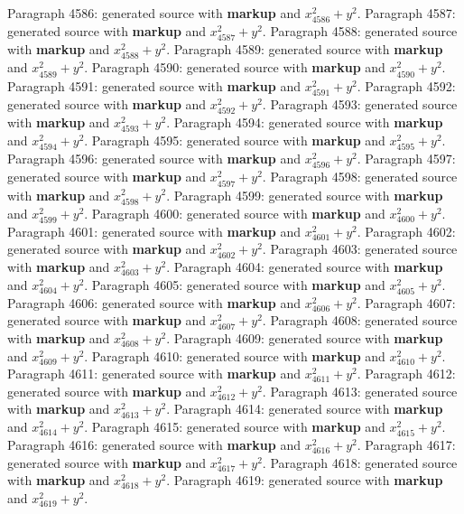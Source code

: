 \documentclass{article}
\begin{document}
Paragraph 4586: generated source with \textbf{markup} and $x_{4586}^2 + y^2$.
Paragraph 4587: generated source with \textbf{markup} and $x_{4587}^2 + y^2$.
Paragraph 4588: generated source with \textbf{markup} and $x_{4588}^2 + y^2$.
Paragraph 4589: generated source with \textbf{markup} and $x_{4589}^2 + y^2$.
Paragraph 4590: generated source with \textbf{markup} and $x_{4590}^2 + y^2$.
Paragraph 4591: generated source with \textbf{markup} and $x_{4591}^2 + y^2$.
Paragraph 4592: generated source with \textbf{markup} and $x_{4592}^2 + y^2$.
Paragraph 4593: generated source with \textbf{markup} and $x_{4593}^2 + y^2$.
Paragraph 4594: generated source with \textbf{markup} and $x_{4594}^2 + y^2$.
Paragraph 4595: generated source with \textbf{markup} and $x_{4595}^2 + y^2$.
Paragraph 4596: generated source with \textbf{markup} and $x_{4596}^2 + y^2$.
Paragraph 4597: generated source with \textbf{markup} and $x_{4597}^2 + y^2$.
Paragraph 4598: generated source with \textbf{markup} and $x_{4598}^2 + y^2$.
Paragraph 4599: generated source with \textbf{markup} and $x_{4599}^2 + y^2$.
Paragraph 4600: generated source with \textbf{markup} and $x_{4600}^2 + y^2$.
Paragraph 4601: generated source with \textbf{markup} and $x_{4601}^2 + y^2$.
Paragraph 4602: generated source with \textbf{markup} and $x_{4602}^2 + y^2$.
Paragraph 4603: generated source with \textbf{markup} and $x_{4603}^2 + y^2$.
Paragraph 4604: generated source with \textbf{markup} and $x_{4604}^2 + y^2$.
Paragraph 4605: generated source with \textbf{markup} and $x_{4605}^2 + y^2$.
Paragraph 4606: generated source with \textbf{markup} and $x_{4606}^2 + y^2$.
Paragraph 4607: generated source with \textbf{markup} and $x_{4607}^2 + y^2$.
Paragraph 4608: generated source with \textbf{markup} and $x_{4608}^2 + y^2$.
Paragraph 4609: generated source with \textbf{markup} and $x_{4609}^2 + y^2$.
Paragraph 4610: generated source with \textbf{markup} and $x_{4610}^2 + y^2$.
Paragraph 4611: generated source with \textbf{markup} and $x_{4611}^2 + y^2$.
Paragraph 4612: generated source with \textbf{markup} and $x_{4612}^2 + y^2$.
Paragraph 4613: generated source with \textbf{markup} and $x_{4613}^2 + y^2$.
Paragraph 4614: generated source with \textbf{markup} and $x_{4614}^2 + y^2$.
Paragraph 4615: generated source with \textbf{markup} and $x_{4615}^2 + y^2$.
Paragraph 4616: generated source with \textbf{markup} and $x_{4616}^2 + y^2$.
Paragraph 4617: generated source with \textbf{markup} and $x_{4617}^2 + y^2$.
Paragraph 4618: generated source with \textbf{markup} and $x_{4618}^2 + y^2$.
Paragraph 4619: generated source with \textbf{markup} and $x_{4619}^2 + y^2$.
\end{document}
